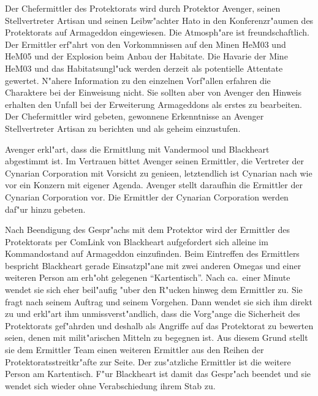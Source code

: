 
Der Chefermittler des Protektorats wird durch Protektor Avenger, seinen Stellvertreter Artisan und seinen Leibw"achter Hato in den Konferenzr"aumen des Protektorats auf Armageddon eingewiesen. Die Atmosph"are ist freundschaftlich. Der Ermittler erf"ahrt von den Vorkommnissen auf den Minen HeM03 und HeM05 und der Explosion beim Anbau der Habitate. Die Havarie der Mine HeM03 und das Habitatsungl"uck werden derzeit als potentielle Attentate gewertet. N"ahere Information zu den einzelnen Vorf"allen erfahren die Charaktere bei der Einweisung nicht. Sie sollten aber von Avenger den Hinweis erhalten den Unfall bei der Erweiterung Armageddons als erstes zu bearbeiten. Der Chefermittler wird gebeten, gewonnene Erkenntnisse an Avenger Stellvertreter Artisan zu berichten und als geheim einzustufen.

Avenger erkl"art, dass die Ermittlung mit Vandermool und Blackheart abgestimmt ist. Im Vertrauen bittet Avenger seinen Ermittler, die Vertreter der Cynarian Corporation mit Vorsicht zu genie\3en, letztendlich ist Cynarian nach wie vor ein Konzern mit eigener Agenda. Avenger stellt daraufhin die Ermittler der Cynarian Corporation vor. Die Ermittler der Cynarian Corporation werden daf"ur hinzu gebeten.

Nach Beendigung des Gespr"achs mit dem Protektor wird der Ermittler des Protektorats per ComLink von Blackheart aufgefordert sich alleine im Kommandostand auf Armageddon einzufinden. Beim Eintreffen des Ermittlers bespricht Blackheart gerade Einsatzpl"ane mit zwei anderen Omegas und einer weiteren Person am erh"oht gelegenen "`Kartentisch"'. Nach ca.~einer Minute  wendet sie sich eher beil"aufig "uber den R"ucken hinweg dem Ermittler zu. Sie fragt nach seinem Auftrag und seinem Vorgehen. Dann wendet sie sich ihm direkt zu und erkl"art ihm unmissverst"andlich, dass die Vorg"ange die Sicherheit des Protektorats gef"ahrden und deshalb als Angriffe auf das Protektorat zu bewerten seien, denen mit milit"arischen Mitteln zu begegnen ist. Aus diesem Grund stellt sie dem Ermittler Team einen weiteren Ermittler aus den Reihen der Protektoratsstreitkr"afte zur Seite. Der zus"atzliche Ermittler ist die weitere Person am Kartentisch. F"ur Blackheart ist damit das Gespr"ach beendet und sie wendet sich wieder ohne Verabschiedung ihrem Stab zu.

